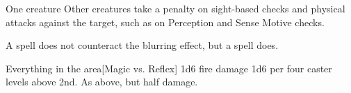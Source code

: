 \begin{spellheader}
    \spellrng{\rngclose}
    \spelldur{\durshort \dismissable}
\end{spellheader}
\begin{spelleffects}
    \begin{spelltarget}{One creature}
        \spelleffect Other creatures take a  penalty on sight-based checks and physical attacks against the target, such as on Perception and Sense Motive checks.
    \end{spelltarget}
\end{spelleffects}
\begin{spellfooter}
    \spellnotes A  spell does not counteract the blurring effect, but a  spell does.
\end{spellfooter}

\begin{spellheader}
\end{spellheader}
\begin{spelleffects}
    \begin{spelltargets}{Everything in the area}[Magic vs. Reflex]
        \spellsuccess 1d6 fire damage \add 1d6 per four caster levels above 2nd.
        \spellfailure As above, but half damage.
    \end{spelltargets}
\end{spelleffects}
\begin{spellfooter}
    
\end{spellfooter}

\begin{comment}
\subsubsection{C}
\end{comment}

